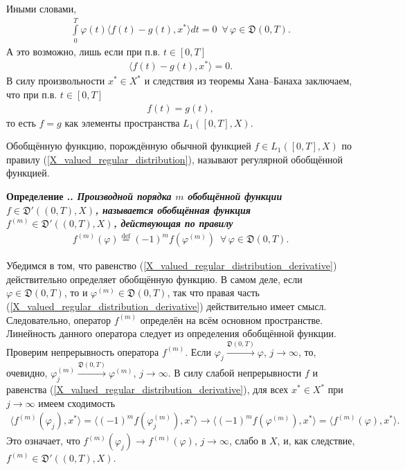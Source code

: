 \documentclass{report}
\newcounter{defin}[section]
\renewcommand{\thedefin}{\thesection.\arabic{defin}}
\newenvironment{Definition}{\par\refstepcounter{defin}\bf Определение
\thedefin.\it}{\rm\par}
\begin{document}
Иными словами,
\begin{gather*}
\int\limits_0^T\varphi(t)\langle f(t)-g(t),x^*\rangle dt=0\,\,\,\forall\,\varphi\in\mathfrak{D}(0,T).
\end{gather*}
А это возможно, лишь если при п.в. $t\in[0,T]$
\begin{gather*}
\langle f(t)-g(t),x^*\rangle=0.
\end{gather*}
В силу произвольности $x^*\in X^*$ и следствия из теоремы Хана--Банаха заключаем, что при п.в. $t\in[0,T]$
\begin{gather*}
f(t)=g(t),
\end{gather*}
то есть $f=g$ как элементы пространства $L_1([0,T],X)$.

Обобщённую функцию, порождённую обычной функцией $f\in L_1([0,T],X)$ по правилу (\ref{X_valued_regular_distribution}), называют регулярной обобщённой функцией.
\begin{Definition}\label{X_valued_distribution_derivative:Definition}
Производной порядка $m$ обобщённой функции $f\in\mathfrak{D}'((0,T),X)$, называется обобщённая функция $f^{(m)}\in\mathfrak{D}'((0,T),X)$, действующая по правилу
\begin{gather}\label{X_valued_regular_distribution_derivative}
f^{(m)}(\varphi)\stackrel{\mathrm{def}}{=}(-1)^mf(\varphi^{(m)})\,\,\,\forall\,\varphi\in\mathfrak{D}(0,T).
\end{gather}
\end{Definition}

Убедимся в том, что равенство (\ref{X_valued_regular_distribution_derivative}) действительно определяет обобщённую функцию. В самом деле, если $\varphi\in\mathfrak{D}(0,T)$, то и
$\varphi^{(m)}\in\mathfrak{D}(0,T)$, так что правая часть (\ref{X_valued_regular_distribution_derivative}) действительно имеет смысл. Следовательно, оператор $f^{(m)}$ определён на всём
основном пространстве. Линейность данного оператора следует из определения обобщённой функции. Проверим непрерывность оператора $f^{(m)}$. Если $\varphi_j
\stackrel{\mathfrak{D}(0,T)}{\longrightarrow}\varphi$, $j\to\infty$, то, очевидно, $\varphi_j^{(m)}\stackrel{\mathfrak{D}(0,T)}{\longrightarrow}\varphi^{(m)}$, $j\to\infty$. В силу слабой
непрерывности $f$ и равенства (\ref{X_valued_regular_distribution_derivative}), для всех $x^*\in X^*$ при $j\to\infty$ имеем сходимость
\begin{gather*}
\langle f^{(m)}(\varphi_j),x^*\rangle=\langle (-1)^mf(\varphi^{(m)}_j),x^*\rangle\to \langle (-1)^mf(\varphi^{(m)}),x^*\rangle=\langle f^{(m)}(\varphi),x^*\rangle.
\end{gather*}
Это означает, что $f^{(m)}(\varphi_j)\to f^{(m)}(\varphi)$, $j\to\infty$, слабо в $X$, и, как следствие, $f^{(m)}\in\mathfrak{D}'((0,T),X)$.
\end{document}
